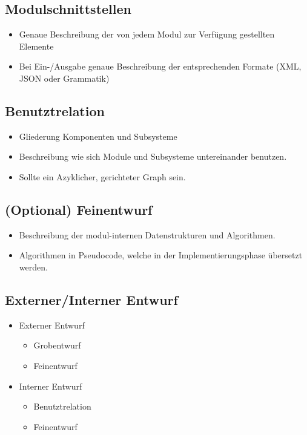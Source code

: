 \subsection{Modulschnittstellen}
\begin{itemize}
    \item Genaue Beschreibung der von jedem Modul zur Verfügung gestellten Elemente
    \item Bei Ein-/Ausgabe genaue Beschreibung der entsprechenden Formate (XML, JSON oder Grammatik)
\end{itemize}
\subsection{Benutztrelation}
\begin{itemize}
    \item Gliederung Komponenten und Subsysteme
    \item Beschreibung wie sich Module und Subsysteme untereinander benutzen.
    \item Sollte ein Azyklicher, gerichteter Graph sein.
\end{itemize}
\subsection{(Optional) Feinentwurf}
\begin{itemize}
    \item Beschreibung der modul-internen Datenstrukturen und Algorithmen.
    \item Algorithmen in Pseudocode, welche in der Implementierungsphase übersetzt werden.
\end{itemize}

\subsection{Externer/Interner Entwurf}
\begin{itemize}
    \item Externer Entwurf
    \begin{itemize}
        \item Grobentwurf
        \item Feinentwurf
    \end{itemize}
    \item Interner Entwurf
    \begin{itemize}
        \item Benutztrelation
        \item Feinentwurf
    \end{itemize}
\end{itemize}

